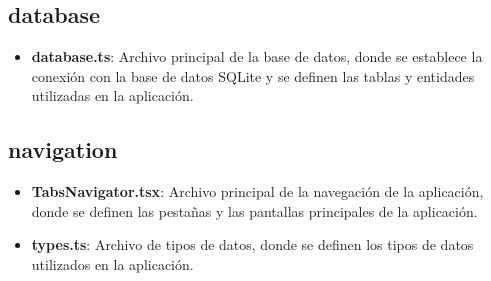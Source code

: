 \documentclass[a4paper,12pt]{article}
\begin{document}
\subsection{database}

\begin{itemize}
    \item \textbf{database.ts}: Archivo principal de la base de datos, donde se establece la conexión con la base de datos SQLite y se definen las tablas y entidades utilizadas en la aplicación.
\end{itemize}

\subsection{navigation}

\begin{itemize}
    \item \textbf{TabsNavigator.tsx}: Archivo principal de la navegación de la aplicación, donde se definen las pestañas y las pantallas principales de la aplicación.
    \item \textbf{types.ts}: Archivo de tipos de datos, donde se definen los tipos de datos utilizados en la aplicación.
\end{itemize}
\end{document}
